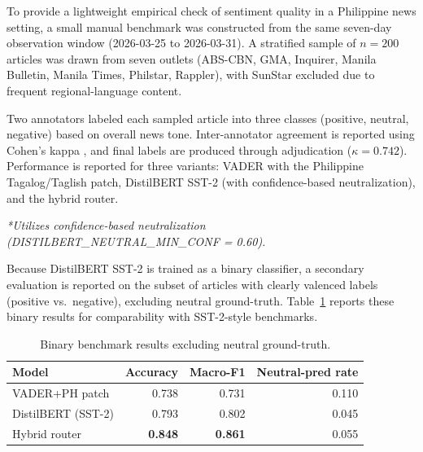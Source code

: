 \documentclass[sigconf, nonacm]{acmart}
\begin{document}
To provide a lightweight empirical check of sentiment quality in a Philippine news setting, a small manual benchmark was constructed from the same seven-day observation window (2026-03-25 to 2026-03-31). A stratified sample of $n=200$ articles was drawn from seven outlets (ABS-CBN, GMA, Inquirer, Manila Bulletin, Manila Times, Philstar, Rappler), with SunStar excluded due to frequent regional-language content.

Two annotators labeled each sampled article into three classes (positive, neutral, negative) based on overall news tone. Inter-annotator agreement is reported using Cohen’s kappa \cite{cohen1960kappa}, and final labels are produced through adjudication ($\kappa=0.742$). Performance is reported for three variants: VADER with the Philippine Tagalog/Taglish patch, DistilBERT SST-2 (with confidence-based neutralization), and the hybrid router.

\begin{table}[h]
  \caption{Manual benchmark results on $n=200$ labeled news articles (3-class: Pos, Neu, Neg).}
  \label{tab:benchmark}
  \centering
  \small
  \setlength{\tabcolsep}{3.5pt}
  \textit{*Utilizes confidence-based neutralization (DISTILBERT\_NEUTRAL\_MIN\_CONF = 0.60).}
\end{table}

Because DistilBERT SST-2 is trained as a binary classifier, a secondary evaluation is reported on the subset of articles with clearly valenced labels (positive vs.\ negative), excluding neutral ground-truth. Table~\ref{tab:benchmark-binary} reports these binary results for comparability with SST-2-style benchmarks. 

\begin{table}[h]
  \caption{Binary benchmark results excluding neutral ground-truth.}
  \label{tab:benchmark-binary}
  \centering
  \small
  \begin{tabular}{lrrr}
    \toprule
    Model & Accuracy & Macro-F1 & Neutral-pred rate \\
    \midrule
    VADER+PH patch      & 0.738 & 0.731 & 0.110 \\
    DistilBERT (SST-2)  & 0.793 & 0.802 & 0.045 \\
    Hybrid router       & \textbf{0.848} & \textbf{0.861} & 0.055 \\
    \bottomrule
  \end{tabular}
\end{table}
\end{document}
